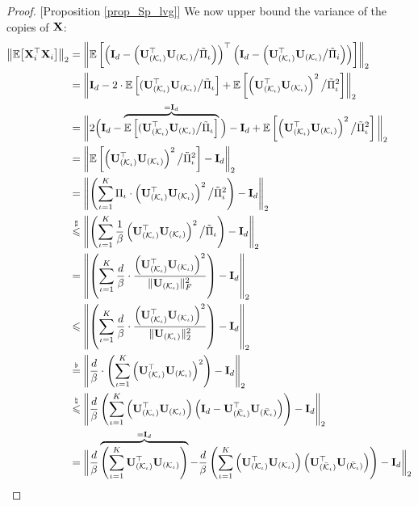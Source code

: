 \documentclass[journal,letterpaper,onecolumn,twoside,nofonttune]{IEEEtran}
\newcommand{\E}{\mathbb{E}}
\newcommand{\K}{\mathcal{K}}
\newcommand{\Kbar}{\bar{\mathcal{K}}}
\newcommand{\Ub}{\bold{U}}
\newcommand{\Ib}{\bold{I}}
\newcommand{\Xb}{\bold{X}}
\newcommand{\Pit}{\tilde{\Pi}}
\begin{document}
\begin{proof}{[Proposition \ref{prop_Sp_lvg}]}
We now upper bound the variance of the copies of $\Xb$:
\begin{align}
  \left\|\E\big[\Xb_i^\top\Xb_i\big]\right\|_2 &= \left\|\E\left[\left(\Ib_d-\left(\Ub_{(\K_\iota)}^\top\Ub_{(\K_\iota)}\big/\Pit_\iota\right)\right)^\top\left(\Ib_d-\left(\Ub_{(\K_\iota)}^\top\Ub_{(\K_\iota)}\big/\Pit_i\right)\right)\right]\right\|_2 \notag\\
  &=\left\|\Ib_d-2\cdot\E\left[(\Ub_{(\K_\iota)}^\top\Ub_{(\K_\iota)}\big/\Pit_\iota\right]+\E\left[\left(\Ub_{(\K_\iota)}^\top\Ub_{(\K_\iota)}\right)^2\big/\Pit_\iota^2\right]\right\|_2\notag\\
  &=\bigg\|2\Big(\Ib_d-\overbrace{\E\left[(\Ub_{(\K_\iota)}^\top\Ub_{(\K_\iota)}\big/\Pit_\iota\right]}^{=\Ib_d}\Big)-\Ib_d+\E\left[\left(\Ub_{(\K_\iota)}^\top\Ub_{(\K_\iota)}\right)^2\big/\Pit_\iota^2\right]\bigg\|_2 \notag\\
  &= \left\|\E\left[\left(\Ub_{(\K_\iota)}^\top\Ub_{(\K_\iota)}\right)^2\big/\Pit_\iota^2\right]-\Ib_d\right\|_2 \notag\\
  &= \left\|\left(\sum_{\iota=1}^K\Pi_\iota\cdot\left(\Ub_{(\K_\iota)}^\top\Ub_{(\K_\iota)}\right)^2\big/\Pit_\iota^2\right)-\Ib_d\right\|_2 \notag\\
  &\overset{\sharp}{\leqslant} \left\|\left(\sum_{\iota=1}^K\frac{1}{\beta}\left(\Ub_{(\K_\iota)}^\top\Ub_{(\K_\iota)}\right)^2\big/\Pit_\iota\right)-\Ib_d\right\|_2 \notag\\
  &= \left\|\left(\sum_{\iota=1}^K\frac{d}{\beta}\cdot\frac{\left(\Ub_{(\K_\iota)}^\top\Ub_{(\K_\iota)}\right)^2}{\|\Ub_{(\K_\iota)}\|_F^2}\right)-\Ib_d\right\|_2 \notag\\
  &\leqslant \left\|\left(\sum_{\iota=1}^K\frac{d}{\beta}\cdot\frac{\left(\Ub_{(\K_\iota)}^\top\Ub_{(\K_\iota)}\right)^2}{\|\Ub_{(\K_\iota)}\|_2^2}\right)-\Ib_d\right\|_2 \notag\\
  &\overset{\flat}{=} \left\|\frac{d}{\beta}\cdot\left(\sum_{\iota=1}^K\left(\Ub_{(\K_\iota)}^\top\Ub_{(\K_\iota)}\right)^2\right)-\Ib_d\right\|_2 \notag\\
  &\overset{\natural}{\leqslant} \left\|\frac{d}{\beta}\left(\sum_{\iota=1}^K\left(\Ub_{(\K_\iota)}^\top\Ub_{(\K_\iota)}\right)\left(\Ib_d-\Ub_{(\Kbar_\iota)}^\top\Ub_{(\Kbar_\iota)}\right)\right)-\Ib_d\right\|_2 \notag\\
  &= \bigg\|\frac{d}{\beta}\overbrace{\left(\sum_{\iota=1}^K\Ub_{(\K_\iota)}^\top\Ub_{(\K_\iota)}\right)}^{=\Ib_d}-\frac{d}{\beta}\left(\sum_{\iota=1}^K\left(\Ub_{(\K_\iota)}^\top\Ub_{(\K_\iota)}\right)\left(\Ub_{(\Kbar_\iota)}^\top\Ub_{(\Kbar_\iota)}\right)\right) -\Ib_d\bigg\|_2 \notag\\

\end{align}
\end{proof}
\end{document}
